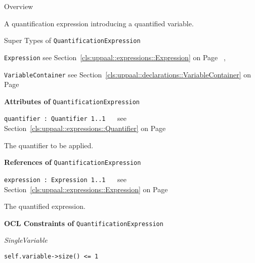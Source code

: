 	\begin{longdescription}
		\item[Overview] 		
				

	

		A quantification expression introducing a quantified variable.		
		\item[Super Types of \texttt{QuantificationExpression}] ~
			\begin{longdescription}
				\item[\texttt{Expression}] see Section~\ref{cls:uppaal::expressions::Expression} on Page~\pageref{cls:uppaal::expressions::Expression}			, 				\item[\texttt{VariableContainer}] see Section~\ref{cls:uppaal::declarations::VariableContainer} on Page~\pageref{cls:uppaal::declarations::VariableContainer}						\end{longdescription}
		
	
			\item[\textbf{Attributes of} \texttt{QuantificationExpression}] ~
			\begin{longdescription}
	\item[\texttt{quantifier : Quantifier 	\symbol{"5B}1..1\symbol{"5D}
}] ~
	see Section~\ref{cls:uppaal::expressions::Quantifier} on Page~\pageref{cls:uppaal::expressions::Quantifier}
	
	\nopagebreak
		
				

	

		The quantifier to be applied.		
			\end{longdescription}
			\item[\textbf{References of} \texttt{QuantificationExpression}] ~
			\begin{longdescription}
	\item[\texttt{expression : Expression 	\symbol{"5B}1..1\symbol{"5D}
}] ~
	see Section~\ref{cls:uppaal::expressions::Expression} on Page~\pageref{cls:uppaal::expressions::Expression}
	
	\nopagebreak
		
				

	

		The quantified expression.		
			\end{longdescription}
			\item[\textbf{OCL Constraints of} \texttt{QuantificationExpression}] ~
			\begin{longdescription}
	\item[\small\textit{SingleVariable}] ~ 
	\nopagebreak
	
		\begin{lstlisting}[breaklines=true]
self.variable->size() <= 1		\end{lstlisting}
			\end{longdescription}
	
	\end{longdescription}
	

